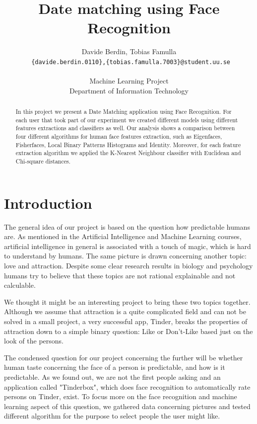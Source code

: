 \documentclass{report}
\title{Date matching using Face Recognition}
\author{Davide Berdin, Tobias Famulla \\
  \texttt{ \{davide.berdin.0110\},\{tobias.famulla.7003\}@student.uu.se} \\
  \\ Machine Learning Project
  \\ Department of Information Technology}
\begin{document}
\maketitle
\newpage

\tableofcontents{}

\begin{abstract}
In this project we present a Date Matching application using Face Recognition. For each user that took part of our experiment we created different models using different features extractions and classifiers as well. Our analysis shows a comparison between four different algorithms for human face features extraction, such as Eigenfaces, Fisherfaces, Local Binary Patterns Histograms and Identity. Moreover, for each feature extraction algorithm we applied the K-Nearest Neighbour classifier with Euclidean and Chi-square distances.
\end{abstract}

\chapter{Introduction}
The general idea of our project is based on the question how predictable humans are.
As mentioned in the Artificial Intelligence and Machine Learning courses, artificial intelligence in general is associated with a touch of magic, which is hard to understand by humans.
The same picture is drawn concerning another topic: love and attraction.
Despite some clear research results in biology and psychology humans try to believe that these topics are not rational explainable and not calculable.

We thought it might be an interesting project to bring these two topics together.
Although we assume that attraction is a quite complicated field and can not be solved in a small project, a very successful app, Tinder, breaks the properties of attraction down to a simple binary question: Like or Don't-Like based just on the look of the persons.

The condensed question for our project concerning the further will be whether human taste concerning the face of a person is predictable, and how is it predictable.
As we found out, we are not the first people asking and an application called "Tinderbox"\cite{tinderbox}, which does face recognition to automatically rate persons on Tinder, exist.
To focus more on the face recognition and machine learning aspect of this question, we gathered data concerning pictures and tested different algorithm for the purpose to select people the user might like.
\end{document}

